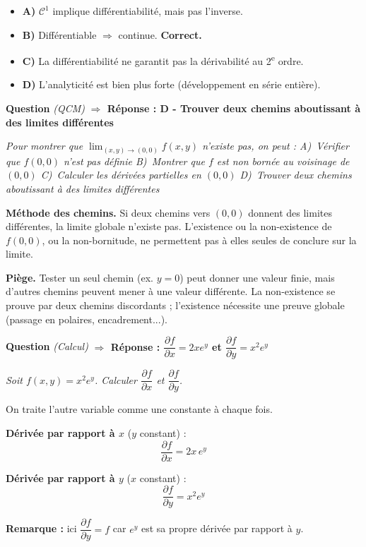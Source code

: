 \documentclass[11pt,a4paper]{article}
\newcounter{qnum}
\newcommand{\qtitre}[2]{%
  \stepcounter{qnum}%
  \medskip\noindent
  \textbf{\color{bleutexte}Question \theqnum}\enspace
  \textit{(#1)}\enspace
  \textcolor{vertok}{\textbf{$\Rightarrow$ Réponse : #2}}
  \par\smallskip
}
\newcommand{\qenonce}[1]{%
  \begin{mdframed}[backgroundcolor=grisbox, linewidth=0pt,
    innerleftmargin=8pt, innerrightmargin=8pt,
    innertopmargin=5pt, innerbottommargin=5pt,
    skipabove=2pt, skipbelow=4pt]
  \small\textit{#1}
  \end{mdframed}
}
\begin{document}
\begin{itemize}[leftmargin=1.5em, itemsep=2pt]
  \item \textcolor{rougeerr}{\textbf{A)}} $\mathcal{C}^1$ implique différentiabilité, mais pas l'inverse.
  \item \textcolor{vertok}{\textbf{B)}} Différentiable $\Rightarrow$ continue. \textbf{Correct.}
  \item \textcolor{rougeerr}{\textbf{C)}} La différentiabilité ne garantit pas la dérivabilité au 2\textsuperscript{e} ordre.
  \item \textcolor{rougeerr}{\textbf{D)}} L'analyticité est bien plus forte (développement en série entière).
\end{itemize}

\qtitre{QCM}{D - Trouver deux chemins aboutissant à des limites différentes}
\qenonce{Pour montrer que $\lim_{(x,y)\to(0,0)} f(x,y)$ n'existe pas, on peut :
\quad A)~Vérifier que $f(0,0)$ n'est pas définie
\quad B)~Montrer que $f$ est non bornée au voisinage de $(0,0)$
\quad C)~Calculer les dérivées partielles en $(0,0)$
\quad D)~Trouver deux chemins aboutissant à des limites différentes}

\begin{methodebox}
\textbf{Méthode des chemins.} Si deux chemins vers $(0,0)$ donnent des limites différentes, la limite globale n'existe pas. L'existence ou la non-existence de $f(0,0)$, ou la non-bornitude, ne permettent pas à elles seules de conclure sur la limite.
\end{methodebox}

\begin{piegebox}
\textbf{Piège.} Tester un seul chemin (ex. $y=0$) peut donner une valeur finie, mais d'autres chemins peuvent mener à une valeur différente. La non-existence se prouve par deux chemins discordants ; l'existence nécessite une preuve globale (passage en polaires, encadrement...).
\end{piegebox}

\qtitre{Calcul}{$\dfrac{\partial f}{\partial x} = 2xe^y$ \quad et \quad $\dfrac{\partial f}{\partial y} = x^2e^y$}
\qenonce{Soit $f(x,y) = x^2 e^{y}$. Calculer $\dfrac{\partial f}{\partial x}$ et $\dfrac{\partial f}{\partial y}$.}

\begin{reponsebox}
On traite l'autre variable comme une constante à chaque fois.

\textbf{Dérivée par rapport à $x$} ($y$ constant) :
$$\boxed{\frac{\partial f}{\partial x} = 2x\,e^y}$$

\textbf{Dérivée par rapport à $y$} ($x$ constant) :
$$\boxed{\frac{\partial f}{\partial y} = x^2 e^y}$$

\textbf{Remarque :} ici $\dfrac{\partial f}{\partial y} = f$ car $e^y$ est sa propre dérivée par rapport à $y$.
\end{reponsebox}
\end{document}
